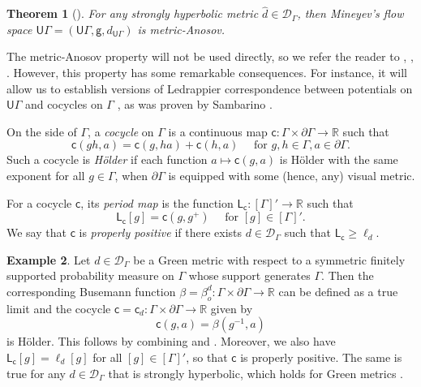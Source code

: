 \documentclass[twoside]{amsart}
\newtheorem{theorem}{Theorem}[section]
\theoremstyle{definition}
\newtheorem{example}[theorem]{Example}
\numberwithin{equation}{section}
\numberwithin{theorem}{section}
\newcommand{\msf}[1]{\mathsf{#1}}
\newcommand{\R}{\mathbb{R}}
\newcommand{\calD}{\mathcal{D}}
\newcommand{\G}{\Gamma}
\newcommand{\ra}{\rightarrow}
\newcommand{\UG}{\msf{U}\G}
\newcommand{\pG}{\partial \G}
\newcommand{\vg}{\msf{g}}
\newcommand{\DMG}[1]{{\color{orange} \bf{(DMG: #1)}}}
\begin{document}
\begin{theorem}[{\cite[Theorem~D]{dilsavor}}]\label{thm:mineyevanosov}
    For any strongly hyperbolic metric $\hat d\in \calD_\G$, then Mineyev's flow space $\UG=(\UG,\vg,d_{\UG})$ is metric-Anosov. 
\end{theorem}

The metric-Anosov property will not be used directly, so we refer the reader to \cite{pollicott},  \cite[Section~2]{sambarino.report}, \cite[Section~3]{CLT.strong}. However, this property has some remarkable consequences. For instance, it will allow us to establish versions of Ledrappier correspondence between potentials on $\UG$ and cocycles on $\G$ \cite[Th\'eor\`eme~3]{ledrappier}, as was proven by Sambarino \cite{sambarino.report}.

On the side of $\G$, a \emph{cocycle} on $\G$ is a continuous map $\msf{c}:\G \times \pG\ra \R$ such that
\[\msf{c}(gh,a)=\msf{c}(g,ha)+\msf{c}(h,a) \quad \text{ for }g,h\in \G, a\in \pG.\]
Such a cocycle is \emph{H\"older} if each function $a\mapsto \msf{c}(g,a)$ is H\"older with the same exponent for all $g\in \G$, when $\pG$ is equipped with some (hence, any) visual metric.

For a cocycle $\msf{c}$, its \emph{period map} is the function  $\msf{L}_{\msf{c}}:[\G]'\ra \R$ such that
\[\msf{L}_{\msf{c}}[g]=\msf{c}(g,g^+) \quad \text{ for }[g]\in [\G]'.\]
We say that $\msf{c}$ is \emph{properly positive} if there exists $d\in \calD_\G$ such that $\msf{L}_{\msf{c}}\geq \ell_d$.
\begin{example}\label{ex:cocyclestrongly}
Let $d\in \calD_\G$ be a Green metric with respect to a symmetric finitely supported probability measure on $\G$ whose support generates $\G$. Then the corresponding Busemann function $\beta=\beta^{d}_o: \G \times \pG \ra \R$ can be defined as a true limit and the cocycle  $\msf{c}=\msf{c}_{d}: \G \times \pG \ra \R$ given by
\[\msf{c}(g,a)=\beta(g^{-1},a)\]
is H\"older. This follows by combining \cite[Theorem~3.3]{INO} and \cite[Theorem~1.7]{BHM.harmonic}. Moreover, we also have $\msf{L}_{\msf{c}}[g]=\ell_{d}[g]$ for all $[g]\in [\G]'$, so that $\msf{c}$ is properly positive. The same is true for any $d\in \calD_\G$ that is strongly hyperbolic, which holds for Green metrics \cite[Theorem~1.3]{nica-spakula}.
\end{example}
\end{document}
